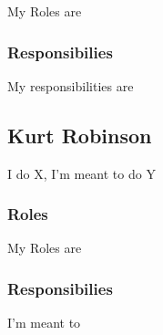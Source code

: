 	My Roles are


\subsubsection{Responsibilies}

	My responsibilities are


\subsection{Kurt Robinson}

I do X, I'm meant to do Y



\subsubsection{Roles}

	My Roles are


\subsubsection{Responsibilies}

	I'm meant to